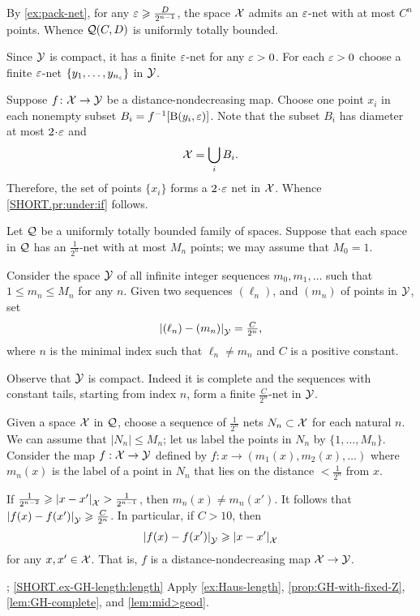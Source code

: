 By \ref{ex:pack-net}, for any $\varepsilon\geqslant\frac D{2^{n-1}}$, the space $\mathcal{X}$ admits an $\varepsilon$-net with at most $C^n$ points.
Whence $\mathcal{Q}(C,D)$ is uniformly totally bounded.

Since $\mathcal{Y}$ is compact, it has a finite $\varepsilon$-net for any $\varepsilon>0$.
For each $\varepsilon>0$ choose a finite $\varepsilon$-net $\{y_1,\dots,y_{n_\varepsilon}\}$ in $\mathcal{Y}$.

Suppose $f\colon\mathcal{X}\to \mathcal{Y}$ be a distance-nondecreasing map.
Choose one point $x_i$ in each nonempty subset $B_i=f^{-1}[\mathrm{B}{}(y_i,\varepsilon)]$.
Note that the subset $B_i$ has diameter at most $2\cdot \eps$ and 
\[\mathcal{X}=\bigcup_iB_i.\]
Therefore, the set of points $\{x_i\}$ forms a $2\cdot\eps$ net in $\mathcal{X}$.
Whence \ref{SHORT.pr:under:if} follows.

 Let $\mathcal{Q}$ be a uniformly totally bounded family of spaces. 
Suppose that each space in $\mathcal{Q}$ has an $\tfrac1{2^n}$-net with at most $M_n$ points; we may assume that $M_0=1$.

Consider the space $\mathcal{Y}$ of all infinite integer sequences $m_0,m_1,\dots$ such that $1\le m_n\le M_n$ for any $n$.
Given two sequences $(\ell_n)$, and $(m_n)$ of points in $\mathcal{Y}$, set 
\[\dist{(\ell_n)}{(m_n)}{\spc{Y}}=\tfrac C{2^{n}},\]
where $n$ is the minimal index such that $\ell_n\ne m_n$ and $C$ is a positive constant.

Observe that $\mathcal{Y}$ is compact.
Indeed it is complete and the sequences with constant tails, starting from index $n$, form a finite $\tfrac C{2^{n}}$-net in $\mathcal{Y}$.

Given a space $\mathcal{X}$ in $\mathcal{Q}$,
choose a sequence of $\tfrac1{2^n}$ nets 
$N_n\subset\mathcal{X}$ for each natural $n$.
We can assume that $|N_n|\le M_n$; let us label the points in $N_n$ by $\{1,\dots,M_n\}$.
Consider the map $f:\mathcal{X}\to\mathcal{Y}$ defined by $f:x\to (m_1(x),m_2(x),\dots)$ where $m_n(x)$ is the label of a point in $N_n$ that lies on the distance $<\tfrac1{2^n}$ from $x$.

If $\tfrac1{2^{n-2}}\ge \dist{x}{x'}{\spc{X}}>\tfrac1{2^{n-1}}$, then $m_n(x)\ne m_n(x')$.
It follows that $\dist{f(x)}{f(x')}{\spc{Y}}\ge \tfrac C{2^{n}}$.
In particular, if $C>10$, then 
\[\dist{f(x)}{f(x')}{\spc{Y}}\ge \dist{x}{x'}{\spc{X}}\]
for any $x,x'\in \mathcal{X}$.
That is, $f$ is a distance-nondecreasing map $\mathcal{X}\to \mathcal{Y}$.

\parbf{\ref{ex-GH-length}}; \ref{SHORT.ex-GH-length:length}
Apply
\ref{ex:Haus-length},
\ref{prop:GH-with-fixed-Z},
\ref{lem:GH-complete},
and \ref{lem:mid>geod}.

